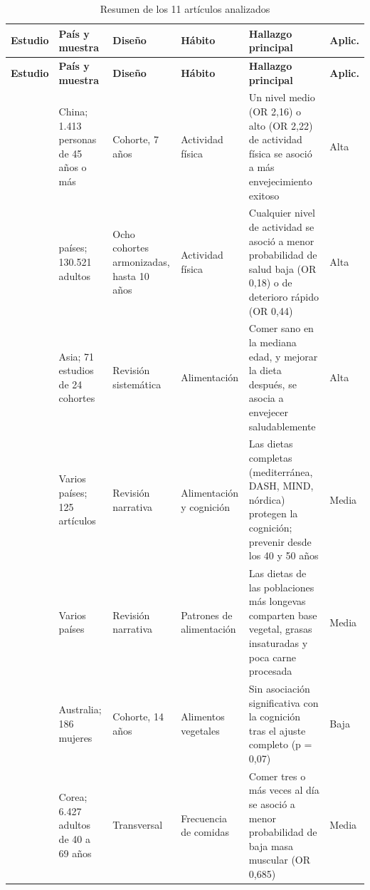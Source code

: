 \documentclass[12pt, letterpaper, table, xcdraw]{extarticle}
\renewcommand{\arraystretch}{2}
\newcommand{\leyendaFont}[1]{\fontsize{10}{12}\selectfont #1}
\begin{document}
{\footnotesize
\renewcommand{\arraystretch}{1.3}
\setlength{\tabcolsep}{4pt}
\begin{longtable}{|>{\raggedright\arraybackslash}p{2.3cm}|>{\raggedright\arraybackslash}p{2.4cm}|>{\raggedright\arraybackslash}p{2cm}|>{\raggedright\arraybackslash}p{2.15cm}|>{\raggedright\arraybackslash}p{3.95cm}|>{\centering\arraybackslash}p{1.1cm}|}
    \caption{\leyendaFont{Resumen de los 11 artículos analizados}}
    \label{tab:papers}\\
    \hline
    \textbf{Estudio} & \textbf{País y muestra} & \textbf{Diseño} & \textbf{Hábito} & \textbf{Hallazgo principal} & \textbf{Aplic.} \\ \hline
    \endfirsthead
    \hline
    \textbf{Estudio} & \textbf{País y muestra} & \textbf{Diseño} & \textbf{Hábito} & \textbf{Hallazgo principal} & \textbf{Aplic.} \\ \hline
    \endhead
    \textcite{zhang2025} & China; 1.413 personas de 45 años o más & Cohorte, 7 años & Actividad física & Un nivel medio (OR 2,16) o alto (OR 2,22) de actividad física se asoció a más envejecimiento exitoso & Alta \\ \hline
    \textcite{morenoagostino2020} & 26 países; 130.521 adultos & Ocho cohortes armonizadas, hasta 10 años & Actividad física & Cualquier nivel de actividad se asoció a menor probabilidad de salud baja (OR 0,18) o de deterioro rápido (OR 0,44) & Alta \\ \hline
    \textcite{zhou2023} & Asia; 71 estudios de 24 cohortes & Revisión sistemática & Alimentación & Comer sano en la mediana edad, y mejorar la dieta después, se asocia a envejecer saludablemente & Alta \\ \hline
    \textcite{puri2023} & Varios países; 125 artículos & Revisión narrativa & Alimentación y cognición & Las dietas completas (mediterránea, DASH, MIND, nórdica) protegen la cognición; prevenir desde los 40 y 50 años & Media \\ \hline
    \textcite{dominguez2022} & Varios países & Revisión narrativa & Patrones de alimentación & Las dietas de las poblaciones más longevas comparten base vegetal, grasas insaturadas y poca carne procesada & Media \\ \hline
    \textcite{le2025} & Australia; 186 mujeres & Cohorte, 14 años & Alimentos vegetales & Sin asociación significativa con la cognición tras el ajuste completo (p = 0,07) & Baja \\ \hline
    \textcite{chun2025} & Corea; 6.427 adultos de 40 a 69 años & Transversal & Frecuencia de comidas & Comer tres o más veces al día se asoció a menor probabilidad de baja masa muscular (OR 0,685) & Media \\ \hline

\end{longtable}}
\end{document}
